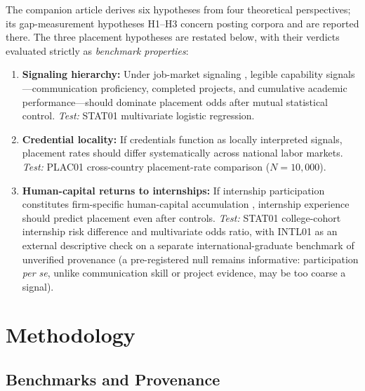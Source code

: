 \documentclass[journal]{IEEEtran}
\begin{document}
The companion article derives six hypotheses from four theoretical perspectives; its gap-measurement hypotheses H1--H3 concern posting corpora and are reported there. The three placement hypotheses are restated below, with their verdicts evaluated strictly as \textit{benchmark properties}:
\begin{enumerate}[label=\textbf{H\arabic*:}, start=4]
    \item \textbf{Signaling hierarchy:} Under job-market signaling \cite{spence1973job}, legible capability signals---communication proficiency, completed projects, and cumulative academic performance---should dominate placement odds after mutual statistical control. \textit{Test:} STAT01 multivariate logistic regression.
    \item \textbf{Credential locality:} If credentials function as locally interpreted signals, placement rates should differ systematically across national labor markets. \textit{Test:} PLAC01 cross-country placement-rate comparison ($N = 10{,}000$).
    \item \textbf{Human-capital returns to internships:} If internship participation constitutes firm-specific human-capital accumulation \cite{becker1964human}, internship experience should predict placement even after controls. \textit{Test:} STAT01 college-cohort internship risk difference and multivariate odds ratio, with INTL01 as an external descriptive check on a separate international-graduate benchmark of unverified provenance (a pre-registered null remains informative: participation \textit{per se}, unlike communication skill or project evidence, may be too coarse a signal).
\end{enumerate}

\section{Methodology}
\label{sec:methodology_p}

\subsection{Benchmarks and Provenance}
\label{sec:corpus_p}
\end{document}
